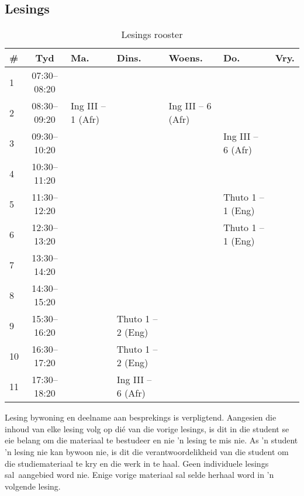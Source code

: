     \subsection{Lesings}
        \begin{table}[!h]
            \begin{center}
             \begin{tabular}{|l|c|p{2.1cm}|p{2.1cm}|p{2.1cm}|p{2.1cm}|p{1.5cm}|}
                 \hline
                 {\bf \#} & {\bf Tyd} & {\bf Ma.} & {\bf Dins.} & {\bf Woens.} &
                 {\bf Do.} & {\bf Vry.} \\
                 \hline
                 1  & 07:30--08:20 &  &  &  &  & \\ \hline
                 2  & 08:30--09:20 &  Ing III -- 1 (Afr)  &  & Ing III -- 6 (Afr) &  & \\ \hline
                 3  & 09:30--10:20 &  &  &  & Ing III -- 6 (Afr) & \\ \hline
                 4  & 10:30--11:20 &  &  &  &  & \\ \hline
                 5  & 11:30--12:20 &  &  &  & Thuto 1 -- 1 (Eng) & \\ \hline
                 6  & 12:30--13:20 &  &  &  & Thuto 1 -- 1 (Eng) & \\ \hline
                 7  & 13:30--14:20 &  &  &  &  & \\ \hline
                 8  & 14:30--15:20 &  &  &  &  & \\ \hline
                 9  & 15:30--16:20 &  & Thuto 1 -- 2 (Eng) &  &  & \\ \hline
                 10 & 16:30--17:20 &  & Thuto 1 -- 2 (Eng) &  &  & \\ \hline
                 11 & 17:30--18:20 &  & Ing III -- 6 (Afr) &  &  & \\
                 \hline
             \end{tabular}
             \caption{Lesings rooster}
            \end{center}
        \end{table}
        
	Lesing bywoning en deelname aan besprekings is verpligtend.
    Aangesien die inhoud van elke lesing volg op di\'{e} van die vorige lesings,
    is dit in die student se eie belang om die materiaal te bestudeer 
    en nie 'n lesing te mis nie. As 'n student 'n  
    lesing nie kan bywoon nie, is dit die verantwoordelikheid 
    van die student om die studiemateriaal te kry en die werk in te haal. 
    Geen individuele lesings sal aangebied word nie. Enige vorige materiaal sal selde 
    herhaal word in 'n volgende lesing.
        
